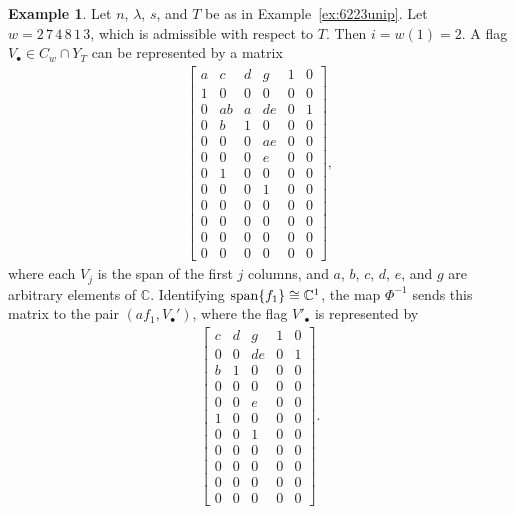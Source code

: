 \documentclass[11pt]{amsart}
\theoremstyle{definition}
\newtheorem{example}[theorem]{Example}
\newcommand{\vspan}{\mathrm{span}}
\begin{document}
\begin{example}\label{ex:274813cell}
Let $n$, $\lambda$, $s$, and $T$ be as in Example~\ref{ex:6223unip}.  Let $w=2\, 7 \, 4\, 8\, 1\, 3$, which is admissible with respect to $T$. Then $i=w(1) = 2$. A flag $V_\bullet\in C_w\cap Y_T$ can be represented by a matrix
\begin{align} \label{eq:CoordinateExampleEq}
    \begin{bmatrix}
    a & c & d & g & 1 & 0 \\
    1 & 0 & 0 & 0 & 0 & 0 \\
    0 & ab& a & de & 0 & 1 \\
    0 & b & 1 & 0 & 0 & 0 \\
    0 & 0 & 0 & ae & 0 & 0 \\
    0 & 0 & 0 & e & 0 & 0 \\
    0 & 1 & 0 & 0 & 0 & 0 \\
    0 & 0 & 0 & 1 & 0 & 0 \\
    0 & 0 & 0 & 0 & 0 & 0 \\
    0 & 0 & 0 & 0 & 0 & 0 \\
    0 & 0 & 0 & 0 & 0 & 0 \\
    0 & 0 & 0 & 0 & 0 & 0
    \end{bmatrix},
\end{align}
where each $V_j$ is the span of the first $j$ columns, and $a$, $b$, $c$, $d$, $e$, and $g$ are arbitrary elements of $\mathbb{C}$. Identifying $\vspan\{f_{1}\}\cong \bC^1$, the map $\Phi^{-1}$ sends this matrix to the pair $(af_1,V_\bullet')$, where the flag $V'_\bullet$ is represented by
\begin{align}
    \begin{bmatrix}
    c & d & g & 1 & 0 \\
    0 & 0 & de & 0 & 1 \\
    b & 1 & 0 & 0 & 0 \\
    0 & 0 & 0 & 0 & 0 \\
    0 & 0 & e & 0 & 0 \\
    1 & 0 & 0 & 0 & 0 \\
    0 & 0 & 1 & 0 & 0 \\
    0 & 0 & 0 & 0 & 0 \\
    0 & 0 & 0 & 0 & 0 \\
    0 & 0 & 0 & 0 & 0 \\
    0 & 0 & 0 & 0 & 0
    \end{bmatrix}.
\end{align}
\end{example}
\end{document}
